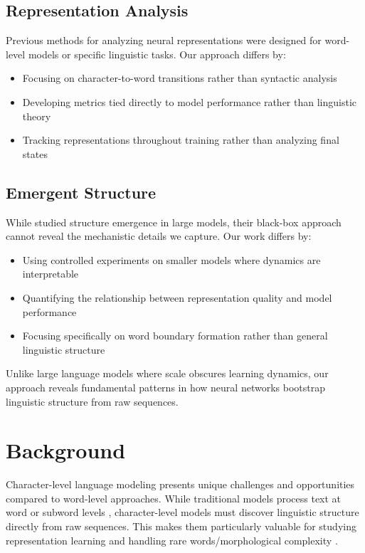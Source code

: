 \documentclass{article} %
\begin{document}
\subsection{Representation Analysis}
Previous methods for analyzing neural representations \citep{Alishahi2019AnalyzingAI,Kadar2016RepresentationOL} were designed for word-level models or specific linguistic tasks. Our approach differs by:
\begin{itemize}
    \item Focusing on character-to-word transitions rather than syntactic analysis \citep{Gulordava2018ColorlessGR}
    \item Developing metrics tied directly to model performance rather than linguistic theory
    \item Tracking representations throughout training rather than analyzing final states
\end{itemize}

\subsection{Emergent Structure}
While \citet{Manning2020EmergentLS} studied structure emergence in large models, their black-box approach cannot reveal the mechanistic details we capture. Our work differs by:
\begin{itemize}
    \item Using controlled experiments on smaller models where dynamics are interpretable
    \item Quantifying the relationship between representation quality and model performance
    \item Focusing specifically on word boundary formation rather than general linguistic structure
\end{itemize}

Unlike large language models \citep{gpt4} where scale obscures learning dynamics, our approach reveals fundamental patterns in how neural networks bootstrap linguistic structure from raw sequences.

\section{Background}
\label{sec:background}

Character-level language modeling presents unique challenges and opportunities compared to word-level approaches. While traditional models process text at word or subword levels \citep{radford2019language}, character-level models must discover linguistic structure directly from raw sequences. This makes them particularly valuable for studying representation learning \citep{goodfellow2016deep} and handling rare words/morphological complexity \citep{Kim2015CharacterAwareNL}.
\end{document}
